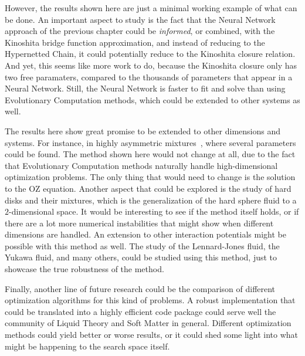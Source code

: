However, the results shown here are just a minimal working example of what can be done. 
An important aspect to study is the fact that the Neural Network approach of the previous 
chapter could be \emph{informed}, or combined, with the Kinoshita bridge function 
approximation, and instead of reducing to the Hypernetted Chain, it could potentially 
reduce to the Kinoshita closure relation. And yet, this seems like more work to do, because 
the Kinoshita closure only has two free paramaters, compared to the thousands of parameters 
that appear in a Neural Network. Still, the Neural Network is faster to fit and solve than 
using Evolutionary Computation methods, which could be extended to other systems as well.

The results here show great promise to be extended to other dimensions and systems. 
For instance, in highly asymmetric mixtures~\cite{zhouLocalStructureThermodynamics2019}, 
where several parameters could be found. The method shown here would not change at all, due 
to the fact that Evolutionary Computation methods naturally handle high-dimensional 
optimization problems. The only thing that would need to change is the solution to the OZ 
equation. Another aspect that could be explored is the study of hard disks and their 
mixtures, which is the generalization of the hard sphere fluid to a \(2\)-dimensional 
space. It would be interesting to see if the method itself holds, or if there are a lot 
more numerical instabilities that might show when different dimensions are handled.
An extension to other interaction potentials might be possible with this method as well. 
The study of the Lennard-Jones fluid, the Yukawa fluid, and many others, could be studied 
using this method, just to showcase the true robustness of the method.

Finally, another line of future research could be the comparison of different optimization 
algorithms for this kind of problems. A robust implementation that could be translated into 
a highly efficient code package could serve well the community of Liquid Theory and Soft 
Matter in general. Different optimization methods could yield better or worse results, or 
it could shed some light into what might be happening to the search space itself.